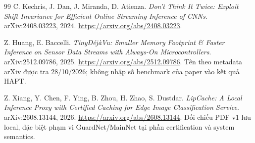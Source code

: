 \documentclass[11pt,a4paper]{article}
\theoremstyle{remark}
\begin{document}
\begin{thebibliography}{99}
 C. Kechris, J. Dan, J. Miranda, D. Atienza.
\emph{Don't Think It Twice: Exploit Shift Invariance for Efficient Online
Streaming Inference of CNNs}. arXiv:2408.03223, 2024.
\url{https://arxiv.org/abs/2408.03223}.

 Z. Huang, E. Baccelli.
\emph{TinyD\'ej\`aVu: Smaller Memory Footprint \& Faster Inference on Sensor
Data Streams with Always-On Microcontrollers}. arXiv:2512.09786, 2025.
\url{https://arxiv.org/abs/2512.09786}. Tên theo metadata arXiv được tra
28/10/2026; không nhập số benchmark của paper vào kết quả HAPT.

 Z. Xiang, Y. Chen, F. Ying, B. Zhou, H. Zhao, S. Dustdar.
\emph{LipCache: A Local Inference Proxy with Certified Caching for Edge
Image Classification Service}. arXiv:2608.13144, 2026.
\url{https://arxiv.org/abs/2608.13144}. Đối chiếu PDF v1 lưu local,
đặc biệt phạm vi GuardNet/MainNet tại phần certification và system semantics.
\end{thebibliography}

\endgroup
\end{document}
